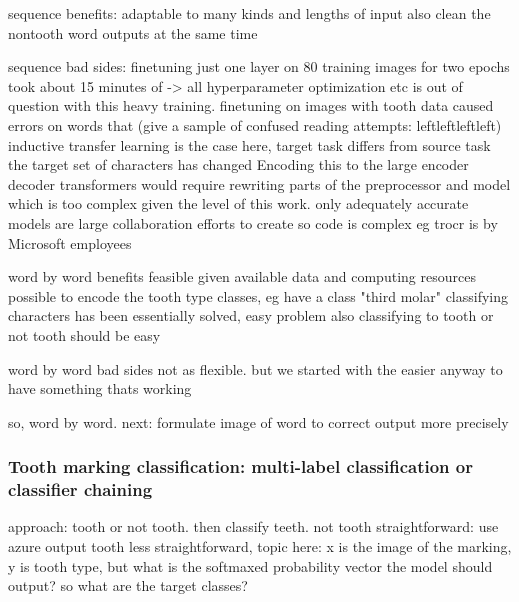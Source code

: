 \documentclass{article}
\begin{document}
sequence benefits:
    adaptable to many kinds and lengths of input
    also clean the nontooth word outputs at the same time

sequence bad sides:
    finetuning just one layer on 80 training images for two epochs took about 15 minutes of \cite{li2021trocr}
        -> all hyperparameter optimization etc is out of question with this heavy training.
    finetuning on images with tooth data caused errors on words that 
        (give a sample of confused reading attempts: leftleftleftleft)
    inductive transfer learning is the case here, target task differs from source task
        the target set of characters has changed
            Encoding this to the large encoder decoder transformers would 
            require rewriting parts of the preprocessor and model which is too complex given the level of this work.
                only adequately accurate models are large collaboration efforts to create so code is complex 
                eg trocr is by Microsoft employees

word by word benefits
feasible given available data and computing resources
possible to encode the tooth type classes, eg have a class "third molar"
classifying characters has been essentially solved, easy problem 
also classifying to tooth or not tooth should be easy 

word by word bad sides
    not as flexible. but we started with the easier anyway to have something thats working

so, word by word. next: formulate image of word to correct output more precisely

\subsubsection{Tooth marking classification: multi-label classification or classifier chaining}

approach: tooth or not tooth. then classify teeth. 
not tooth straightforward: use azure output
tooth less straightforward, topic here: x is the image of the marking, y is tooth type, but what is the 
softmaxed probability vector the model should output? so what are the target classes?
\end{document}
